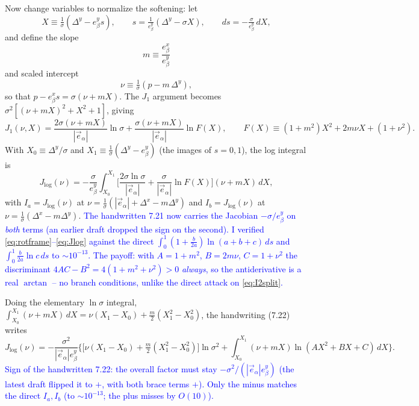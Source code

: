 \documentclass[11pt]{article}
\numberwithin{equation}{section}
\newcommand{\vv}[1]{\vec{#1}}
\newcommand{\cam}[1]{\textcolor{blue}{#1}}
\begin{document}
Now change variables to normalize the softening: let
\begin{equation}\label{eq:Xsub}
  X\equiv\tfrac{1}{\sigma}(\Delta^y-e_\beta^y s),\qquad
  s=\tfrac{1}{e_\beta^y}(\Delta^y-\sigma X),\qquad ds=-\tfrac{\sigma}{e_\beta^y}\,dX ,
\end{equation}
and define the slope
\begin{equation}
  m\equiv\frac{e_\beta^x}{e_\beta^y}
\end{equation}
and scaled intercept
\begin{equation}\label{eq:mnu}
  \nu\equiv\tfrac{1}{\sigma}(p-m\,\Delta^y),
\end{equation}
so that $p-e_\beta^x s=\sigma(\nu+mX)$. The $J_1$ argument becomes $\sigma^2[(\nu+mX)^2+X^2+1]$, giving
\begin{equation}\label{eq:J1X}
  J_1(\nu,X)=\frac{2\sigma(\nu+mX)}{|\vv e_\alpha|}\ln\sigma
  +\frac{\sigma(\nu+mX)}{|\vv e_\alpha|}\ln F(X),\qquad F(X)\equiv(1+m^2)X^2+2m\nu X+(1+\nu^2).
\end{equation}
With $X_0\equiv\Delta^y/\sigma$ and $X_1\equiv\tfrac1\sigma(\Delta^y-e_\beta^y)$ (the images of $s=0,1$),
the log integral is
\begin{equation}\label{eq:Jlog}
  J_{\log}(\nu)=-\frac{\sigma}{e_\beta^y}\int_{X_0}^{X_1}\!\Big[\frac{2\sigma\ln\sigma}{|\vv e_\alpha|}
  +\frac{\sigma}{|\vv e_\alpha|}\ln F(X)\Big](\nu+mX)\,dX ,
\end{equation}
with $I_a=J_{\log}(\nu)$ at $\nu=\tfrac1\sigma(|\vv e_\alpha|+\Delta^x-m\Delta^y)$ and $I_b=J_{\log}(\nu)$
at $\nu=\tfrac1\sigma(\Delta^x-m\Delta^y)$.
\cam{The handwritten 7.21 now carries the Jacobian $-\sigma/e_\beta^y$ on \emph{both} terms (an earlier
draft dropped the sign on the second). I verified \eqref{eq:rotframe}--\eqref{eq:Jlog} against the direct
$\int_0^1(1+\tfrac b{2a})\ln(a{+}b{+}c)\,ds$ and $\int_0^1\tfrac b{2a}\ln c\,ds$ to $\sim10^{-13}$. The
payoff: with $A=1+m^2$, $B=2m\nu$, $C=1+\nu^2$ the discriminant $4AC-B^2=4(1+m^2+\nu^2)>0$ \emph{always},
so the antiderivative is a real $\arctan$ -- no branch conditions, unlike the direct attack on
\eqref{eq:I2split}.}

Doing the elementary $\ln\sigma$ integral, $\int_{X_0}^{X_1}(\nu+mX)\,dX
=\nu(X_1{-}X_0)+\tfrac m2(X_1^2{-}X_0^2)$, the handwriting (7.22) writes
\begin{equation}\label{eq:Jlog7p22}
  J_{\log}(\nu)=-\frac{\sigma^2}{|\vv e_\alpha|e_\beta^y}\bigg\{
  \big[\nu(X_1{-}X_0)+\tfrac m2(X_1^2{-}X_0^2)\big]\ln\sigma^2
  +\int_{X_0}^{X_1}(\nu+mX)\ln(AX^2{+}BX{+}C)\,dX\bigg\}.
\end{equation}
\cam{Sign of the handwritten 7.22: the overall factor must stay $-\sigma^2/(|\vv e_\alpha|e_\beta^y)$
(the latest draft flipped it to $+$, with both brace terms $+$). Only the minus matches the direct
$I_a,I_b$ (to $\sim10^{-13}$; the plus misses by $O(10)$).}
\end{document}
